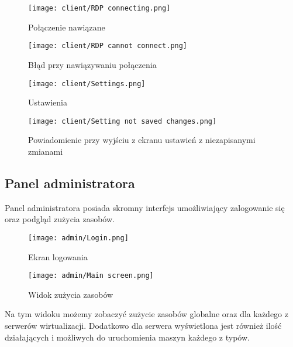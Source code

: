 \documentclass[../deliverable-two.tex]{subfiles}
\begin{document}
\begin{figure}[H]
  \centering\texttt{[image: client/RDP connecting.png]}
  \caption{Połączenie nawiązane}
\end{figure}

\begin{figure}[H]
  \centering\texttt{[image: client/RDP cannot connect.png]}
  \caption{Błąd przy nawiązywaniu połączenia}
\end{figure}

\begin{figure}[H]
  \centering\texttt{[image: client/Settings.png]}
  \caption{Ustawienia}
\end{figure}

\begin{figure}[H]
  \centering\texttt{[image: client/Setting not saved changes.png]}
  \caption{Powiadomienie przy wyjściu z ekranu ustawień z niezapisanymi zmianami}
\end{figure}

\pagebreak

\subsection{Panel administratora}

Panel administratora posiada skromny interfejs umożliwiający zalogowanie się oraz podgląd zużycia zasobów.

\begin{figure}[H]
  \centering\texttt{[image: admin/Login.png]}
  \caption{Ekran logowania}
\end{figure}

\begin{figure}[H]
  \centering\texttt{[image: admin/Main screen.png]}
  \caption{Widok zużycia zasobów}
\end{figure}

Na tym widoku możemy zobaczyć zużycie zasobów globalne oraz dla każdego z serwerów wirtualizacji. Dodatkowo dla serwera wyświetlona jest również ilość działających i możliwych do uruchomienia maszyn każdego z typów.
\end{document}
